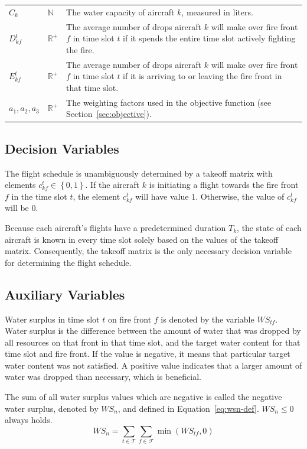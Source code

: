 \begin{table}[htb]
\begin{tabularx}{\hsize}{@{}llX@{}}
$C_k$             & $\mathbb{N}$   & The water capacity of aircraft $k$, measured in liters. \\
$D_{kf}^t$        & $\mathbb{R}^+$ & The average number of drops aircraft $k$ will make over fire front $f$ in time slot $t$ if it spends the entire time slot actively fighting the fire. \\
$E_{kf}^t$        & $\mathbb{R}^+$ & The average number of drops aircraft $k$ will make over fire front $f$ in time slot $t$ if it is arriving to or leaving the fire front in that time slot. \\
$a_1, a_2, a_3$   & $\mathbb{R}^+$ & The weighting factors used in the objective function (see Section~\ref{sec:objective}). \\
\end{tabularx}
\end{table}


\subsection{Decision Variables}

The flight schedule is unambiguously determined by a takeoff matrix with elements \hbox{$c_{kf}^t \in \left\{ 0, 1 \right\}$}.
If the aircraft $k$ is initiating a flight towards the fire front $f$ in the time slot $t$, the element $c_{kf}^t$ will have value $1$.
Otherwise, the value of $c_{kf}^t$ will be $0$.

Because each aircraft's flights have a predetermined duration $T_k$, the state of each aircraft is known in every time slot solely based on the values of the takeoff matrix.
Consequently, the takeoff matrix is the only necessary decision variable for determining the flight schedule.


\subsection{Auxiliary Variables}

Water surplus in time slot $t$ on fire front $f$ is denoted by the variable $\mathit{WS}_{tf}$.
Water surplus is the difference between the amount of water that was dropped by all resources on that front in that time slot, and the target water content for that time slot and fire front.
If the value is negative, it means that particular target water content was not satisfied.
A positive value indicates that a larger amount of water was dropped than necessary, which is beneficial.

The sum of all water surplus values which are negative is called the negative water surplus, denoted by $\mathit{WS}_n$, and defined in Equation~\ref{eq:wsn-def}.
$\mathit{WS}_n \le 0$ always holds.
\begin{equation}\label{eq:wsn-def}
\mathit{WS}_n = \sum_{t \in \mathcal{T}} \sum_{f \in \mathcal{F}} \min (\!\mathit{WS}_{tf}, 0 )
\end{equation}


